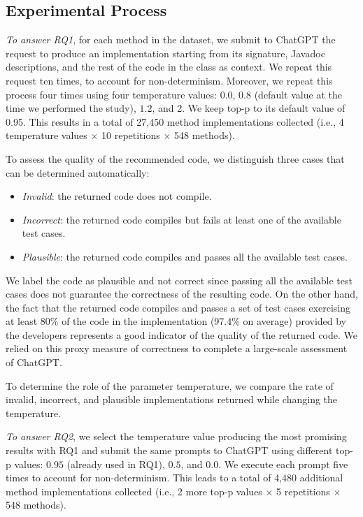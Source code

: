\subsection{Experimental Process} \label{sec:process}

\emph{To answer RQ1}, for each method in the dataset, we submit to ChatGPT the request to produce an implementation starting from its signature, Javadoc descriptions, and the rest of the code in the class as context.
We repeat this request ten times, to account for non-determinism. Moreover, we repeat this process four times using four temperature values: $0.0$, $0.8$ (default value at the time we performed the study), $1.2$, and $2$. We keep top-p to its default value of 0.95. This results in a total of 27,450 method implementations collected (i.e., 4 temperature values $\times$ 10 repetitions $\times$ 548 methods).

To assess the quality of the recommended code, we distinguish three cases that can be determined automatically:

\begin{itemize}

\item \emph{Invalid}: the returned code does not compile.

\item \emph{Incorrect}: the returned code compiles but fails at least one of the available test cases.


\item \emph{Plausible}: the returned code compiles and passes all the available test cases. 
\end{itemize}

We label the code as plausible and not correct since passing all the available test cases does not guarantee the correctness of the resulting code. On the other hand, the fact that the returned code compiles and passes a set of test cases exercising at least 80\% of the code in the implementation (97.4\% on average) provided by the developers represents a good indicator of the quality of the returned code. We relied on this proxy measure of correctness to complete a large-scale assessment of ChatGPT.

To determine the role of the parameter temperature, we compare the rate of invalid, incorrect, and plausible implementations returned while changing the temperature.  

\emph{To answer RQ2}, we select the temperature value producing the most promising results with RQ1 and submit the same prompts to ChatGPT using different top-p values: $0.95$ (already used in RQ1), $0.5$, and $0.0$. We execute each prompt five times to account for non-determinism. This leads to a total of 4,480 additional method implementations collected (i.e., 2 more top-p values $\times$ 5 repetitions $\times$ 548 methods).

